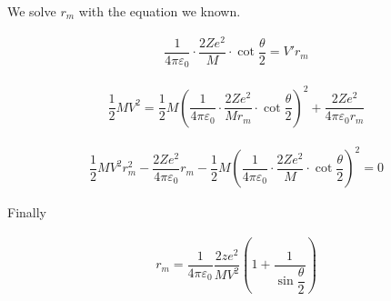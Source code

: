 We solve $r_m$ with the equation we known.

\begin{equation*}
  \begin{aligned}
    \dfrac{1}{4 \pi \varepsilon_0} \cdot \dfrac{2 Z e^2}{M} \cdot \cot \dfrac{\theta}{2} = V' r_m
  \end{aligned}
\end{equation*}

\begin{equation*}
  \begin{aligned}
    \dfrac{1}{2} M V^2 = \dfrac{1}{2} M \left( \dfrac{1}{4 \pi \varepsilon_0} \cdot \dfrac{2 Z e^2}{M r_m} \cdot \cot \dfrac{\theta}{2} \right)^{2} + \dfrac{2 Z e^2}{4 \pi \varepsilon_0 r_m}  
  \end{aligned}
\end{equation*}

\begin{equation*}
  \begin{aligned}
    \dfrac{1}{2} M V^2 r_m^2 - \dfrac{2 Z e^2}{4 \pi \varepsilon_0} r_m - \dfrac{1}{2} M \left( \dfrac{1}{4 \pi \varepsilon_0} \cdot \dfrac{2 Z e^2}{M} \cdot \cot \dfrac{\theta}{2} \right)^{2} = 0
  \end{aligned}
\end{equation*}

Finally

\begin{equation*}
  \begin{aligned}
    r_m = \dfrac{1}{4 \pi \varepsilon_0} \dfrac{2 z e^2}{M V^2} \left( 1 + \dfrac{1}{\sin \dfrac{\theta}{2} }  \right)  
  \end{aligned}
\end{equation*}


